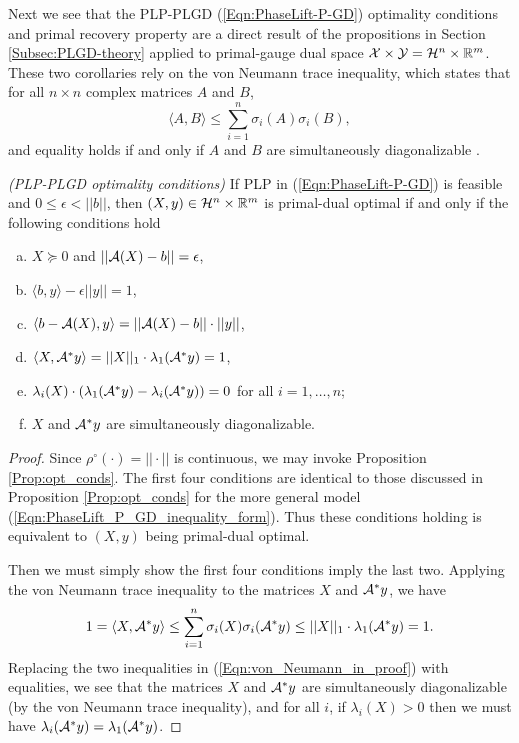 Next we see that the PLP-PLGD (\ref{Eqn:PhaseLift-P-GD}) optimality conditions and primal recovery property are a direct result of the propositions in Section \ref{Subsec:PLGD-theory} applied to primal-gauge dual space ${\mathcal X} \times {\mathcal Y} = {\mathcal H}^n \times {\mathbb R}^m$.  These two corollaries rely on the von Neumann trace inequality, which states that for all $n \times n$ complex matrices $A$ and $B$,
\begin{equation}			\label{Eqn:von_Neumann_trace_inequality}
\langle A, B \rangle \leq \sum_{i=1}^n \sigma_i(A) \sigma_i(B),
\end{equation}
and equality holds if and only if $A$ and $B$ are simultaneously diagonalizable \cite{grigorieff1991note}.

\begin{cor} 		\label{Cor:PLGD-optimality}
\emph{(PLP-PLGD optimality conditions)}
If PLP in (\ref{Eqn:PhaseLift-P-GD}) is feasible and $0 \leq \epsilon < ||b||$, then $(X, y) \in {\mathcal H}^n \times {\mathbb R}^m$ is primal-dual optimal if and only if the following conditions hold
\begin{enumerate}[(a)]
\item
$X \succeq 0$ and $||{\mathcal A}(X) -b||=\epsilon$,

\item
$\langle b, y \rangle - \epsilon ||y|| = 1$,

\item
$\langle b - {\mathcal A}(X), y \rangle = ||{\mathcal A}(X)-b|| \cdot ||y||$,

\item
$\langle X, {\mathcal A}^*y \rangle = ||X||_1 \cdot \lambda_1({\mathcal A}^*y) = 1$,

\item
$\lambda_i(X) \cdot \left( \lambda_1({\mathcal A}^* y) - \lambda_i ({\mathcal A}^* y)  \right) = 0$ for all $i = 1, \ldots, n$;

\item
$X$ and ${\mathcal A}^*y$ are simultaneously diagonalizable.
\end{enumerate}
\end{cor}
\begin{proof}
Since $\rho^\circ(\cdot) = ||\cdot||$ is continuous, we may invoke Proposition \ref{Prop:opt_conds}. The first four conditions are identical to those discussed in Proposition \ref{Prop:opt_conds} for the more general model (\ref{Eqn:PhaseLift_P_GD_inequality_form}).  Thus these conditions holding is equivalent to $(X,y)$ being primal-dual optimal.

Then we must simply show the first four conditions imply the last two.    Applying the von Neumann trace inequality to the matrices $X$ and ${\mathcal A}^*y$, we have
\begin{equation}		\label{Eqn:von_Neumann_in_proof}
1 = \langle X, {\mathcal A}^*y \rangle \leq \sum_{i=1}^n \sigma_i(X) \sigma_i({\mathcal A}^*y) \leq ||X||_1 \cdot \lambda_1({\mathcal A}^*y) = 1.
\end{equation}
Replacing the two inequalities in (\ref{Eqn:von_Neumann_in_proof}) with equalities, we see that the matrices $X$ and ${\mathcal A}^*y$ are simultaneously diagonalizable (by the von Neumann trace inequality), and for all $i$, if $\lambda_i(X) > 0$ then we must have $\lambda_i({\mathcal A}^*y) = \lambda_1({\mathcal A}^*y)$.
\end{proof}
